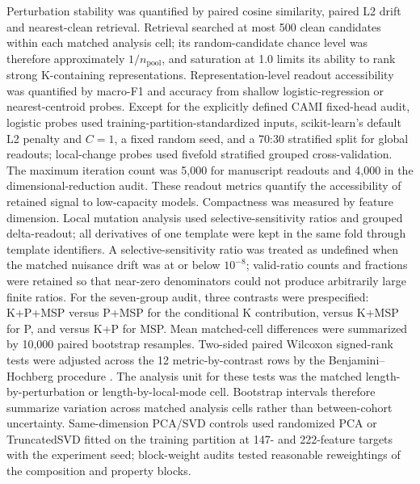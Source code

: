 Perturbation stability was quantified by paired cosine similarity, paired L2 drift and nearest-clean retrieval. Retrieval searched at most 500 clean candidates within each matched analysis cell; its random-candidate chance level was therefore approximately $1/n_{\mathrm{pool}}$, and saturation at 1.0 limits its ability to rank strong K-containing representations. Representation-level readout accessibility was quantified by macro-F1 and accuracy from shallow logistic-regression or nearest-centroid probes. Except for the explicitly defined CAMI fixed-head audit, logistic probes used training-partition-standardized inputs, scikit-learn's default L2 penalty and $C=1$, a fixed random seed, and a 70:30 stratified split for global readouts; local-change probes used fivefold stratified grouped cross-validation. The maximum iteration count was 5,000 for manuscript readouts and 4,000 in the dimensional-reduction audit. These readout metrics quantify the accessibility of retained signal to low-capacity models. Compactness was measured by feature dimension. Local mutation analysis used selective-sensitivity ratios and grouped delta-readout; all derivatives of one template were kept in the same fold through template identifiers. A selective-sensitivity ratio was treated as undefined when the matched nuisance drift was at or below $10^{-8}$; valid-ratio counts and fractions were retained so that near-zero denominators could not produce arbitrarily large finite ratios. For the seven-group audit, three contrasts were prespecified: K+P+MSP versus P+MSP for the conditional K contribution, versus K+MSP for P, and versus K+P for MSP. Mean matched-cell differences were summarized by 10,000 paired bootstrap resamples. Two-sided paired Wilcoxon signed-rank tests were adjusted across the 12 metric-by-contrast rows by the Benjamini--Hochberg procedure \citep{Wilcoxon1945,Benjamini1995}. The analysis unit for these tests was the matched length-by-perturbation or length-by-local-mode cell. Bootstrap intervals therefore summarize variation across matched analysis cells rather than between-cohort uncertainty. Same-dimension PCA/SVD controls used randomized PCA or TruncatedSVD fitted on the training partition at 147- and 222-feature targets with the experiment seed; block-weight audits tested reasonable reweightings of the composition and property blocks.

